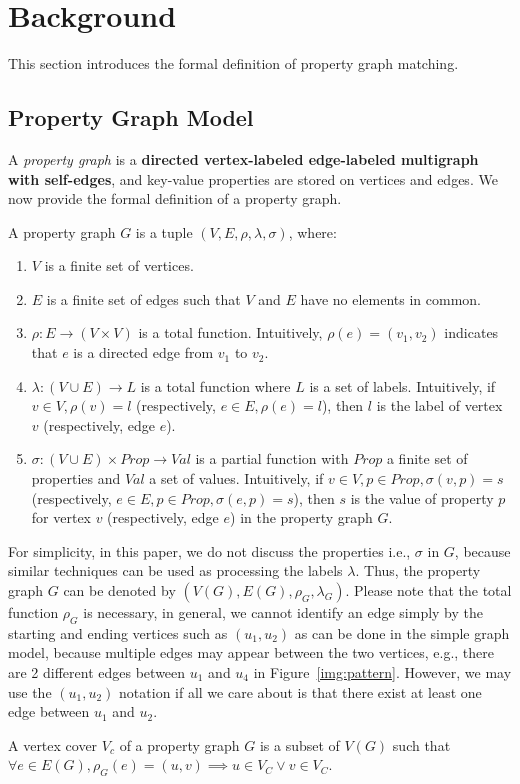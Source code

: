 \section{Background}\label{sec:background}
This section introduces the formal definition of property graph matching.
\subsection{Property Graph Model}
A \emph{property graph} is a \textbf{directed vertex-labeled edge-labeled multigraph with self-edges},
and key-value properties are stored on vertices and edges.
We now provide the formal definition of a property graph.
\begin{definition}
  A property graph $G$ is a tuple $(V, E, \rho, \lambda, \sigma)$, where:
  \begin{enumerate}[noitemsep,label={(\arabic*)}]
  \item $V$ is a finite set of vertices.
  \item $E$ is a finite set of edges such that $V$ and $E$ have no elements in common.
  \item $\rho: E \rightarrow (V \times V)$ is a total function.
    Intuitively, $\rho(e) = (v_1, v_2)$ indicates that $e$ is a directed edge from $v_1$ to $v_2$.
  \item $\lambda :(V \cup E) \rightarrow L$ is a total function where $L$ is a set of labels.
    Intuitively, if $v \in V, \rho(v) = l$ (respectively, $e \in E, \rho(e) = l$),
    then $l$ is the label of vertex $v$ (respectively, edge $e$).
  \item $\sigma: (V \cup E) \times Prop \rightarrow Val$ is a partial function with $Prop$ a finite set of properties and $Val$ a set of values.
    Intuitively, if $v \in V, p \in Prop, \sigma(v, p) = s$ (respectively, $e \in E, p \in Prop, \sigma(e, p) = s$),
    then $s$ is the value of property $p$ for vertex $v$ (respectively, edge $e$) in the property graph $G$.
  \end{enumerate}
\end{definition}
For simplicity, in this paper, we do not discuss the properties i.e., $\sigma$ in $G$,
because similar techniques can be used as processing the labels $\lambda$.
Thus, the property graph $G$ can be denoted by $(V(G), E(G), \rho_G, \lambda_G)$.
Please note that the total function $\rho_G$ is necessary, in general,
we cannot identify an edge simply by the starting and ending vertices such as $(u_1, u_2)$ as can be done in the simple graph model,
because multiple edges may appear between the two vertices,
e.g., there are 2 different edges between $u_1$ and $u_4$ in Figure~\ref{img:pattern}.
However, we may use the $(u_1, u_2)$ notation if all we care about is that there exist at least one edge between $u_1$ and $u_2$.
\begin{definition}
  A vertex cover $V_c$ of a property graph $G$ is a subset of $V(G)$ such that
  $\forall e \in E(G), \rho_G(e) = (u, v) \implies u \in V_C \lor v \in V_C$.
\end{definition}
